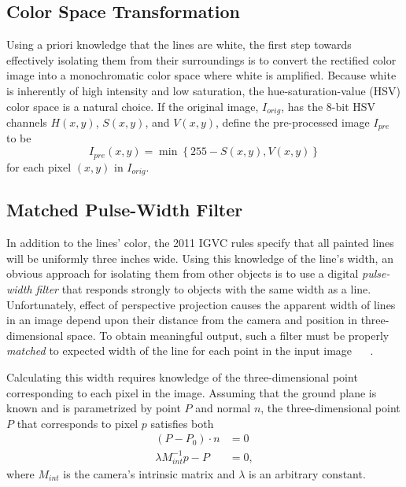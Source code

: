 \documentclass[twocolumn,11pt]{article}
\begin{document}
\subsection{Color Space Transformation}
\label{sec:line-color}
Using a priori knowledge that the lines are white, the first step towards
effectively isolating them from their surroundings is to convert the rectified
color image into a monochromatic color space where white is amplified. Because
white is inherently of high intensity and low saturation, the
hue-saturation-value (HSV) color space is a natural choice. If the original
image, $I_{orig}$, has the 8-bit HSV channels $H(x,y)$, $S(x, y)$, and $V(x,
y)$, define the pre-processed image $I_{pre}$ to be
\begin{equation*}
	I_{pre}(x, y) = \min\left\{255 - S(x, y), V(x, y)\right\}
\end{equation*}
for each pixel $(x, y)$ in $I_{orig}$.

\subsection{Matched Pulse-Width Filter}
\label{sec:line-filter}
In addition to the lines' color, the 2011 IGVC rules specify that all painted
lines will be uniformly three inches wide. Using this knowledge of the line's
width, an  obvious approach for isolating them from other objects is to use a
digital \textit{pulse-width filter} that responds strongly to objects with the
same width as a line. Unfortunately, effect of perspective projection causes
the apparent width of lines in an image depend upon their distance from the
camera and position in three-dimensional space. To obtain meaningful output,
such a filter must be properly \textit{matched} to expected width of the line
for each point in the input image ~\cite{huang_thesis} ~\cite{huang_paper}.

Calculating this width requires knowledge of the three-dimensional point
corresponding to each pixel in the image. Assuming that the ground plane is
known and is parametrized by point $P$ and normal $n$, the three-dimensional
point $P$ that corresponds to pixel $p$ satisfies both
\begin{align*}
	(P - P_0) \cdot n          &= 0 \\
	\lambda M^{-1}_{int} p - P &= 0,
\end{align*}
where $M_{int}$ is the camera's intrinsic matrix and $\lambda$ is an arbitrary
constant.
\end{document}

